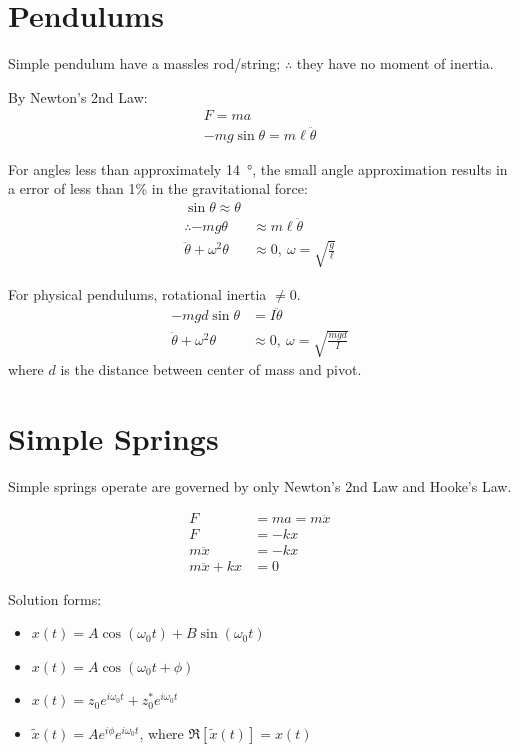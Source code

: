 \documentclass[a4paper, titlepage]{book}
\numberwithin{equation}{section}
\begin{document}
\section{Pendulums}

Simple pendulum have a massles rod/string;
\(\therefore\) they have no moment of inertia.

By Newton's 2nd Law:
\begin{align}
    F = ma \\
    -mg \sin \theta = m \ell \ddot{\theta}
\end{align}

For angles less than approximately \qty{14}{\degree},
the small angle approximation results in a error of less than 1\% in the gravitational force:
\begin{align}
    \sin\theta \approx \theta \\
    \therefore -mg\theta            &\approx m \ell \ddot{\theta} \\
    \ddot{\theta} + \omega^2 \theta &\approx 0,~\omega = \sqrt{\frac{g}{\ell}}
\end{align}

For physical pendulums, rotational inertia \(\ne 0\).
\begin{align}
    -mgd \sin\theta                &=       I \ddot{\theta} \\
    \ddot{\theta} + \omega^2\theta &\approx 0,~\omega = \sqrt{\frac{mgd}{I}}
\end{align}
where \(d\) is the distance between center of mass and pivot.

\section{Simple Springs}
Simple springs operate are governed by only Newton's 2nd Law and Hooke's Law.

\begin{align}
    F              &= ma = m\ddot{x} \\
    F              &= -kx \\
    m\ddot{x}      &= -kx \\
    m\ddot{x} + kx &= 0
\end{align}

Solution forms:
\begin{itemize}
    \item \(x(t) = A\cos\left(\omega_0 t\right) + B\sin\left(\omega_0 t\right)\)
    \item \(x(t) = A\cos\left(\omega_0 t + \phi\right)\)
    \item \(x(t) = z_0 e^{i \omega_0 t} + z^*_0 e^{i \omega_0 t}\)
    \item \(\tilde{x}(t) = A e^{i \phi} e^{i \omega_0 t}\),
          where \(\Re[\tilde{x}(t)] = x(t)\)
\end{itemize}
\end{document}
